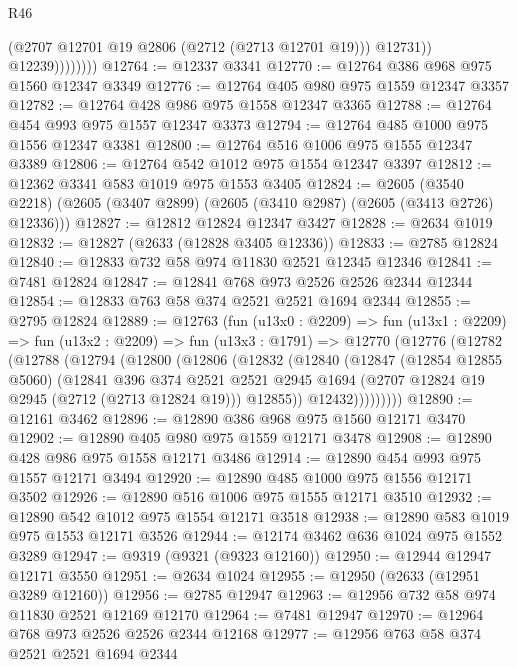 \begin{lexlean}{R46}
\begin{coremodule}
                        (@2707 @12701 @19 @2806 (@2712 (@2713 @12701 @19)))
                        @12731))
                    @12239))))))))
@12764 := @12337 @3341
@12770 := @12764 @386 @968 @975 @1560 @12347 @3349
@12776 := @12764 @405 @980 @975 @1559 @12347 @3357
@12782 := @12764 @428 @986 @975 @1558 @12347 @3365
@12788 := @12764 @454 @993 @975 @1557 @12347 @3373
@12794 := @12764 @485 @1000 @975 @1556 @12347 @3381
@12800 := @12764 @516 @1006 @975 @1555 @12347 @3389
@12806 := @12764 @542 @1012 @975 @1554 @12347 @3397
@12812 := @12362 @3341 @583 @1019 @975 @1553 @3405
@12824 := @2605
    (@3540 @2218)
    (@2605 (@3407 @2899) (@2605 (@3410 @2987) (@2605 (@3413 @2726) @12336)))
@12827 := @12812 @12824 @12347 @3427
@12828 := @2634 @1019
@12832 := @12827 (@2633 (@12828 @3405 @12336))
@12833 := @2785 @12824
@12840 := @12833 @732 @58 @974 @11830 @2521 @12345 @12346
@12841 := @7481 @12824
@12847 := @12841 @768 @973 @2526 @2526 @2344 @12344
@12854 := @12833 @763 @58 @374 @2521 @2521 @1694 @2344
@12855 := @2795 @12824
@12889 := @12763
    (fun (u13x0 : @2209) =>
    fun (u13x1 : @2209) =>
    fun (u13x2 : @2209) =>
    fun (u13x3 : @1791) =>
    @12770
      (@12776
        (@12782
          (@12788
            (@12794
              (@12800
                (@12806
                  (@12832
                    (@12840
                      (@12847
                        (@12854 @12855 @5060)
                        (@12841
                          @396
                          @374
                          @2521
                          @2521
                          @2945
                          @1694
                          (@2707 @12824 @19 @2945 (@2712 (@2713 @12824 @19)))
                          @12855))
                      @12432)))))))))
@12890 := @12161 @3462
@12896 := @12890 @386 @968 @975 @1560 @12171 @3470
@12902 := @12890 @405 @980 @975 @1559 @12171 @3478
@12908 := @12890 @428 @986 @975 @1558 @12171 @3486
@12914 := @12890 @454 @993 @975 @1557 @12171 @3494
@12920 := @12890 @485 @1000 @975 @1556 @12171 @3502
@12926 := @12890 @516 @1006 @975 @1555 @12171 @3510
@12932 := @12890 @542 @1012 @975 @1554 @12171 @3518
@12938 := @12890 @583 @1019 @975 @1553 @12171 @3526
@12944 := @12174 @3462 @636 @1024 @975 @1552 @3289
@12947 := @9319 (@9321 (@9323 @12160))
@12950 := @12944 @12947 @12171 @3550
@12951 := @2634 @1024
@12955 := @12950 (@2633 (@12951 @3289 @12160))
@12956 := @2785 @12947
@12963 := @12956 @732 @58 @974 @11830 @2521 @12169 @12170
@12964 := @7481 @12947
@12970 := @12964 @768 @973 @2526 @2526 @2344 @12168
@12977 := @12956 @763 @58 @374 @2521 @2521 @1694 @2344

\end{coremodule}
\end{lexlean}
